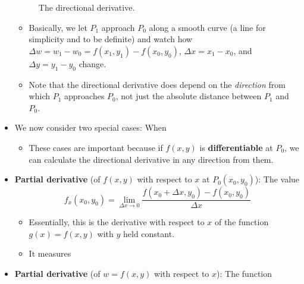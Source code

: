 \documentclass[../main.tex]{subfiles}
\begin{document}
\begin{itemize}
\begin{figure}[h!]
        \caption{The directional derivative.}
        \label{fig:directionalDerivative}
    \end{figure}
    \begin{itemize}
        \item Basically, we let $P_1$ approach $P_0$ along a smooth curve (a line for simplicity and to be definite) and watch how $\Delta w=w_1-w_0=f(x_1,y_1)-f(x_0,y_0)$, $\Delta x=x_1-x_0$, and $\Delta y=y_1-y_0$ change.
        \item Note that the directional derivative does depend on the \emph{direction} from which $P_1$ approaches $P_0$, not just the absolute distance between $P_1$ and $P_0$.
    \end{itemize}
    \item We now consider two special cases: When 
    \begin{itemize}
        \item These cases are important because if $f(x,y)$ is \textbf{differentiable} at $P_0$, we can calculate the directional derivative in any direction from them.
    \end{itemize}
    \item \textbf{Partial derivative} (of $f(x,y)$ with respect to $x$ at $P_0(x_0,y_0)$): The value
    \begin{equation*}
        f_x(x_0,y_0) = \lim_{\Delta x\to 0}\frac{f(x_0+\Delta x,y_0)-f(x_0,y_0)}{\Delta x}
    \end{equation*}
    \begin{itemize}
        \item Essentially, this is the derivative with respect to $x$ of the function $g(x)=f(x,y)$ with $y$ held constant.
        \item It measures 
    \end{itemize}
    \item \textbf{Partial derivative} (of $w=f(x,y)$ with respect to $x$): The function
    \begin{equation*}

\end{equation*}
\end{itemize}
\end{document}
